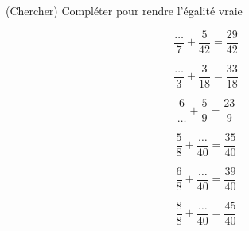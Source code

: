  (Chercher) Compléter pour rendre l'égalité vraie

\begin{multicols}{6}
$$\dfrac{\dots}{7}+\dfrac{ 5}{42}=\dfrac{29}{42}$$

$$\dfrac{\dots}{3}+\dfrac{ 3}{18}=\dfrac{33}{18}$$

$$\dfrac{6}{\dots}+\dfrac{ 5}{9}=\dfrac{23}{9}$$

$$\dfrac{5}{8}+\dfrac{ \dots}{40}=\dfrac{35}{40}$$

$$\dfrac{6}{8}+\dfrac{ \dots}{40}=\dfrac{39}{40}$$

$$\dfrac{8}{8}+\dfrac{ \dots}{40}=\dfrac{45}{40}$$

\end{multicols}